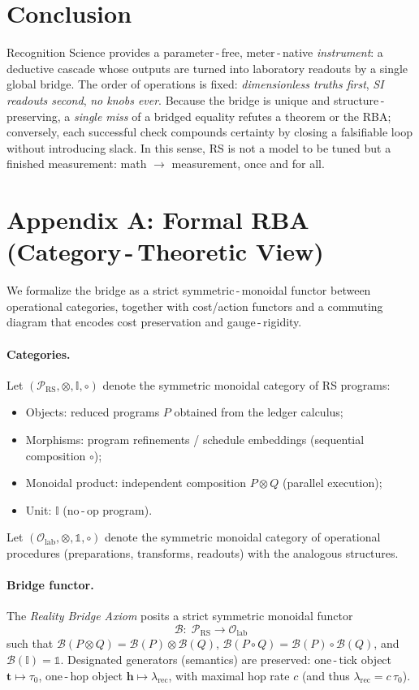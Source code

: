 \documentclass[11pt]{article}
\newcommand{\lamrec}{\lambda_{\mathrm{rec}}}
\newcommand{\tauzero}{\tau_{0}}
\theoremstyle{remark}
\begin{document}
\section{Conclusion}
Recognition Science provides a parameter\,\mbox{-}\,free, meter\,\mbox{-}\,native \emph{instrument}: a deductive cascade whose
outputs are turned into laboratory readouts by a single global bridge. The order of
operations is fixed: \emph{dimensionless truths first}, \emph{SI readouts second}, \emph{no knobs ever}.
Because the bridge is unique and structure\,\mbox{-}\,preserving, a \emph{single miss} of a bridged
equality refutes a theorem or the RBA; conversely, each successful check compounds
certainty by closing a falsifiable loop without introducing slack. In this sense,
RS is not a model to be tuned but a finished measurement: math $\to$ measurement,
once and for all.

\appendix
\section*{Appendix A: Formal RBA (Category\,\mbox{-}\,Theoretic View)}
We formalize the bridge as a strict symmetric\,\mbox{-}\,monoidal functor between operational
categories, together with cost/action functors and a commuting diagram that encodes
cost preservation and gauge\,\mbox{-}\,rigidity.

\paragraph{Categories.}
Let $(\mathcal P_{\mathrm{RS}},\otimes,\mathbb I,\circ)$ denote the symmetric monoidal category of
RS programs:
\begin{itemize}
  \item Objects: reduced programs $P$ obtained from the ledger calculus;
  \item Morphisms: program refinements / schedule embeddings (sequential composition $\circ$);
  \item Monoidal product: independent composition $P\otimes Q$ (parallel execution);
  \item Unit: $\mathbb I$ (no\,\mbox{-}\,op program).
\end{itemize}
Let $(\mathcal O_{\mathrm{lab}},\otimes,\mathbb 1,\circ)$ denote the symmetric monoidal category of operational procedures (preparations, transforms, readouts) with the analogous structures.

\paragraph{Bridge functor.}
The \emph{Reality Bridge Axiom} posits a strict symmetric monoidal functor
\[
  \boxed{\;\mathcal B:\; \mathcal P_{\mathrm{RS}}\longrightarrow \mathcal O_{\mathrm{lab}}\;}
\]
such that $\mathcal B(P\otimes Q)=\mathcal B(P)\otimes \mathcal B(Q)$,
$\mathcal B(P\circ Q)=\mathcal B(P)\circ \mathcal B(Q)$, and $\mathcal B(\mathbb I)=\mathbb 1$.
Designated generators (semantics) are preserved: one\,\mbox{-}\,tick object $\mathbf t\mapsto\tauzero$,
one\,\mbox{-}\,hop object $\mathbf h\mapsto\lamrec$, with maximal hop rate $c$ (and thus $\lamrec=c\,\tauzero$).
\end{document}
